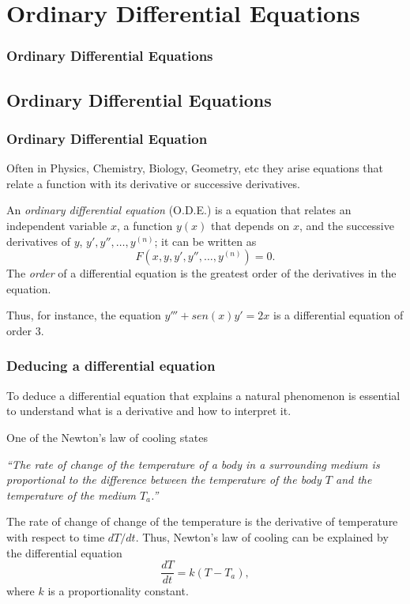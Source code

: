
\section{Ordinary Differential Equations}
\begin{frame}
\frametitle{Ordinary Differential Equations}
\tableofcontents[sectionstyle=show/hide,hideothersubsections]
\end{frame}



\subsection{Ordinary Differential Equations}
\begin{frame}
\frametitle{Ordinary Differential Equation}
Often in Physics, Chemistry, Biology, Geometry, etc they arise equations that relate a function with its derivative or successive derivatives.

\begin{definition}
An \emph{ordinary differential equation} (O.D.E.) is a equation that relates an independent variable $x$, a function $y(x)$ that depends on $x$, and the successive derivatives of $y$, $y',y'',\ldots,y^{(n)}$; it can be written as
\[
F(x, y, y', y'',\ldots, y^{(n)})=0.
\] 
The \emph{order} of a differential equation is the greatest order of the derivatives in the equation. 
\end{definition}
Thus, for instance, the equation $y'''+sen(x)y'=2x$ is a differential equation of order 3.
\end{frame}


\begin{frame}
\frametitle{Deducing a differential equation}
To deduce a differential equation that explains a natural phenomenon is essential to understand what is a derivative and how to interpret it. 

 One of the Newton's law of cooling states
\begin{center}
\begin{minipage}{0.8\textwidth}
\textit{``The rate of change of the temperature of a body in a surrounding medium is proportional to the difference between the temperature of the body $T$ and the temperature of the medium $T_a$.''}
\end{minipage}
\end{center}
The rate of change of change of the temperature is the derivative of temperature with respect to time $dT/dt$.
Thus, Newton's law of cooling can be explained by the differential equation
\[
\frac{dT}{dt}=k(T-T_a),
\]
where $k$ is a proportionality constant.
\end{frame}


